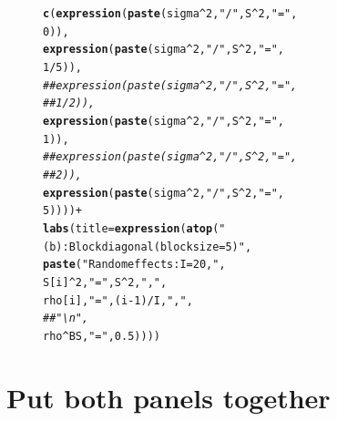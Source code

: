 \documentclass{article}\usepackage[]{graphicx}\usepackage[]{color}
\makeatletter
\newcommand{\hlnum}[1]{\textcolor[rgb]{0.686,0.059,0.569}{#1}}%
\newcommand{\hlstr}[1]{\textcolor[rgb]{0.192,0.494,0.8}{#1}}%
\newcommand{\hlcom}[1]{\textcolor[rgb]{0.678,0.584,0.686}{\textit{#1}}}%
\newcommand{\hlopt}[1]{\textcolor[rgb]{0,0,0}{#1}}%
\newcommand{\hlstd}[1]{\textcolor[rgb]{0.345,0.345,0.345}{#1}}%
\newcommand{\hlkwc}[1]{\textcolor[rgb]{0.333,0.667,0.333}{#1}}%
\newcommand{\hlkwd}[1]{\textcolor[rgb]{0.737,0.353,0.396}{\textbf{#1}}}%
\newenvironment{kframe}{%
 \def\at@end@of@kframe{}%
 \ifinner\ifhmode%
  \def\at@end@of@kframe{\end{minipage}}%
  \begin{minipage}{\columnwidth}%
 \fi\fi%
 \def\FrameCommand##1{\hskip\@totalleftmargin \hskip-\fboxsep
 \colorbox{shadecolor}{##1}\hskip-\fboxsep
     \hskip-\linewidth \hskip-\@totalleftmargin \hskip\columnwidth}%
 \MakeFramed {\advance\hsize-\width
   \@totalleftmargin\z@ \linewidth\hsize
   \@setminipage}}%
 {\par\unskip\endMakeFramed%
 \at@end@of@kframe}
\newenvironment{knitrout}{}{} %
\makeatother
\begin{document}
\begin{figure}[h]
\begin{knitrout}
\begin{kframe}
\begin{alltt}
                         \hlkwd{c}\hlstd{(}\hlkwd{expression}\hlstd{(}\hlkwd{paste}\hlstd{(sigma}\hlopt{^}\hlnum{2}\hlstd{,} \hlstr{"/"}\hlstd{, S}\hlopt{^}\hlnum{2}\hlstd{,} \hlstr{"="}\hlstd{,}
                                            \hlnum{0}\hlstd{)),}
                           \hlkwd{expression}\hlstd{(}\hlkwd{paste}\hlstd{(sigma}\hlopt{^}\hlnum{2}\hlstd{,} \hlstr{"/"}\hlstd{, S}\hlopt{^}\hlnum{2}\hlstd{,} \hlstr{"="}\hlstd{,}
                                            \hlnum{1}\hlopt{/}\hlnum{5}\hlstd{)),}
                           \hlcom{##expression(paste(sigma^2, "/", S^2, "=",}
                           \hlcom{##                1/2)),}
                           \hlkwd{expression}\hlstd{(}\hlkwd{paste}\hlstd{(sigma}\hlopt{^}\hlnum{2}\hlstd{,} \hlstr{"/"}\hlstd{, S}\hlopt{^}\hlnum{2}\hlstd{,} \hlstr{"="}\hlstd{,}
                                            \hlnum{1}\hlstd{)),}
                           \hlcom{##expression(paste(sigma^2, "/", S^2, "=",}
                           \hlcom{##                 2)),}
                           \hlkwd{expression}\hlstd{(}\hlkwd{paste}\hlstd{(sigma}\hlopt{^}\hlnum{2}\hlstd{,} \hlstr{"/"}\hlstd{, S}\hlopt{^}\hlnum{2}\hlstd{,} \hlstr{"="}\hlstd{,}
                                            \hlnum{5}\hlstd{))))} \hlopt{+}
  \hlkwd{labs}\hlstd{(}\hlkwc{title}\hlstd{=}\hlkwd{expression}\hlstd{(}\hlkwd{atop}\hlstd{(}\hlstr{"(b): Block diagonal (block size=5)"}\hlstd{,}
                             \hlkwd{paste}\hlstd{(}\hlstr{"Random effects: I = 20, "}\hlstd{,}
                                          \hlstd{S[i]}\hlopt{^}\hlnum{2}\hlstd{,} \hlstr{" = "}\hlstd{, S}\hlopt{^}\hlnum{2}\hlstd{,} \hlstr{", "}\hlstd{,}
                                          \hlstd{rho[i],} \hlstr{" = "}\hlstd{, (i}\hlopt{-}\hlnum{1}\hlstd{)}\hlopt{/}\hlstd{I,} \hlstr{", "}\hlstd{,}
                                          \hlcom{##"\textbackslash{}n",}
                                          \hlstd{rho}\hlopt{^}\hlstd{BS,} \hlstr{" = "}\hlstd{,} \hlnum{0.5}\hlstd{))))}
\end{alltt}
\end{kframe}
\end{knitrout}
\end{figure}

\section{Put both panels together}
\end{document}
